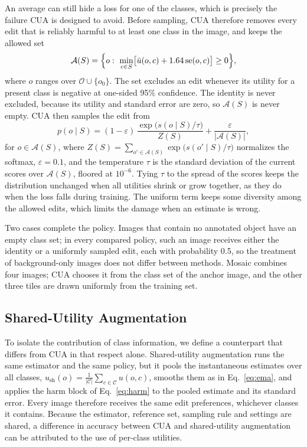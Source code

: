 \documentclass[conference]{IEEEtran}
\begin{document}
An average can still hide a loss for one of the classes, which is precisely the failure CUA is designed to avoid. Before sampling, CUA therefore removes every edit that is reliably harmful to at least one class in the image, and keeps the allowed set
\begin{equation}
\mathcal{A}(S)=\Bigl\{o:\ \min_{c\in S}\bigl[\bar u(o,c)+1.64\,\mathrm{se}(o,c)\bigr]\geq 0\Bigr\},
\label{eq:harm}
\end{equation}
where $o$ ranges over $\mathcal{O}\cup\{o_0\}$. The set excludes an edit whenever its utility for a present class is negative at one-sided 95\% confidence. The identity is never excluded, because its utility and standard error are zero, so $\mathcal{A}(S)$ is never empty. CUA then samples the edit from
\begin{equation}
p(o\mid S)=(1-\varepsilon)\,\frac{\exp\bigl(s(o\mid S)/\tau\bigr)}{Z(S)}+\frac{\varepsilon}{|\mathcal{A}(S)|},
\label{eq:sampling}
\end{equation}
for $o\in\mathcal{A}(S)$, where $Z(S)=\sum_{o'\in\mathcal{A}(S)}\exp\bigl(s(o'\mid S)/\tau\bigr)$ normalizes the softmax, $\varepsilon=0.1$, and the temperature $\tau$ is the standard deviation of the current scores over $\mathcal{A}(S)$, floored at $10^{-6}$. Tying $\tau$ to the spread of the scores keeps the distribution unchanged when all utilities shrink or grow together, as they do when the loss falls during training. The uniform term keeps some diversity among the allowed edits, which limits the damage when an estimate is wrong.

Two cases complete the policy. Images that contain no annotated object have an empty class set; in every compared policy, such an image receives either the identity or a uniformly sampled edit, each with probability 0.5, so the treatment of background-only images does not differ between methods. Mosaic combines four images; CUA chooses it from the class set of the anchor image, and the other three tiles are drawn uniformly from the training set.

\subsection{Shared-Utility Augmentation}
\label{sec:method_shared}

To isolate the contribution of class information, we define a counterpart that differs from CUA in that respect alone. Shared-utility augmentation runs the same estimator and the same policy, but it pools the instantaneous estimates over all classes, $u_{\mathrm{sh}}(o)=\frac{1}{|\mathcal{C}|}\sum_{c\in\mathcal{C}}u(o,c)$, smooths them as in Eq.~\eqref{eq:ema}, and applies the harm block of Eq.~\eqref{eq:harm} to the pooled estimate and its standard error. Every image therefore receives the same edit preferences, whichever classes it contains. Because the estimator, reference set, sampling rule and settings are shared, a difference in accuracy between CUA and shared-utility augmentation can be attributed to the use of per-class utilities.
\end{document}
